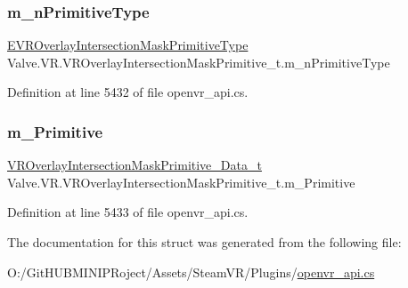 \subsubsection{\texorpdfstring{m\_nPrimitiveType}{m\_nPrimitiveType}}
{\footnotesize\ttfamily \mbox{\hyperlink{namespace_valve_1_1_v_r_a05602250e6a175887b78fb2e83121abc}{E\+V\+R\+Overlay\+Intersection\+Mask\+Primitive\+Type}} Valve.\+V\+R.\+V\+R\+Overlay\+Intersection\+Mask\+Primitive\+\_\+t.\+m\+\_\+n\+Primitive\+Type}



Definition at line 5432 of file openvr\+\_\+api.\+cs.

\mbox{\label{struct_valve_1_1_v_r_1_1_v_r_overlay_intersection_mask_primitive__t_a96459ae33ae41806b0345893ded69be5}} 
\subsubsection{\texorpdfstring{m\_Primitive}{m\_Primitive}}
{\footnotesize\ttfamily \mbox{\hyperlink{struct_valve_1_1_v_r_1_1_v_r_overlay_intersection_mask_primitive___data__t}{V\+R\+Overlay\+Intersection\+Mask\+Primitive\+\_\+\+Data\+\_\+t}} Valve.\+V\+R.\+V\+R\+Overlay\+Intersection\+Mask\+Primitive\+\_\+t.\+m\+\_\+\+Primitive}



Definition at line 5433 of file openvr\+\_\+api.\+cs.



The documentation for this struct was generated from the following file\+:\begin{DoxyCompactItemize}
\item 
O\+:/\+Git\+H\+U\+B\+M\+I\+N\+I\+P\+Roject/\+Assets/\+Steam\+V\+R/\+Plugins/\mbox{\hyperlink{openvr__api_8cs}{openvr\+\_\+api.\+cs}}\end{DoxyCompactItemize}
